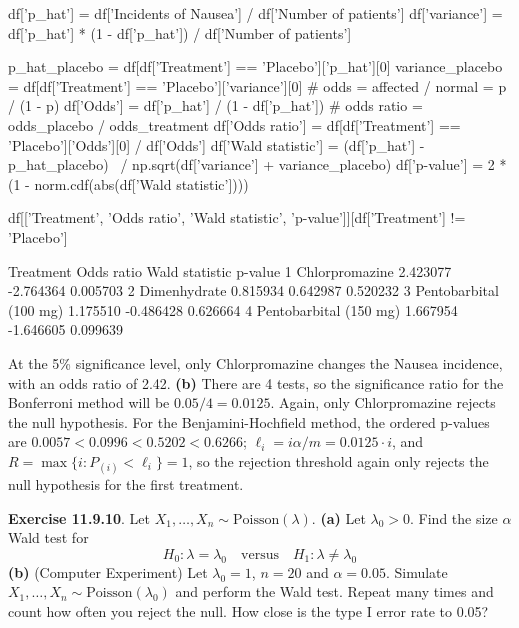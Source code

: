\begin{python}
df['p_hat'] = df['Incidents of Nausea'] / df['Number of patients']
df['variance'] = df['p_hat'] * (1 - df['p_hat']) / df['Number of patients']
\end{python}

\begin{python}
p_hat_placebo = df[df['Treatment'] == 'Placebo']['p_hat'][0]
variance_placebo = df[df['Treatment'] == 'Placebo']['variance'][0]
# odds = affected / normal = p / (1 - p)
df['Odds'] = df['p_hat'] / (1 - df['p_hat'])
# odds ratio = odds_placebo / odds_treatment
df['Odds ratio'] = df[df['Treatment'] == 'Placebo']['Odds'][0] / df['Odds']
df['Wald statistic'] = (df['p_hat'] - p_hat_placebo) \
                        / np.sqrt(df['variance'] + variance_placebo)
df['p-value'] = 2 * (1 - norm.cdf(abs(df['Wald statistic'])))
\end{python}

\begin{python}
df[['Treatment', 'Odds ratio', 'Wald statistic', 'p-value']][df['Treatment'] != 'Placebo']
\end{python}
\begin{console}
                Treatment  Odds ratio  Wald statistic   p-value
1          Chlorpromazine    2.423077       -2.764364  0.005703
2            Dimenhydrate    0.815934        0.642987  0.520232
3  Pentobarbital (100 mg)    1.175510       -0.486428  0.626664
4  Pentobarbital (150 mg)    1.667954       -1.646605  0.099639
\end{console}
        
    At the 5\% significance level, only Chlorpromazine changes the Nausea
incidence, with an odds ratio of 2.42.
\textbf{(b)} There are 4 tests, so the significance ratio for the
Bonferroni method will be \(0.05 / 4 = 0.0125\). Again, only
Chlorpromazine rejects the null hypothesis.
For the Benjamini-Hochfield method, the ordered p-values are
\(0.0057 < 0.0996 < 0.5202 < 0.6266\);
\(\ell_{i} = i \alpha / m = 0.0125 \cdot i\), and
\(R = \max \{ i : P_{(i)} < \ell_{i} \} = 1\), so the rejection threshold
again only rejects the null hypothesis for the first treatment.

\textbf{Exercise 11.9.10}. Let
\(X_{1}, \dots, X_{n} \sim \text{Poisson}(\lambda)\).
\textbf{(a)} Let \(\lambda_{0} > 0\). Find the size \(\alpha\) Wald test
for
\[
H_{0}: \lambda = \lambda_{0} \quad \text{versus} \quad H_{1}: \lambda \neq \lambda_{0}
\]
\textbf{(b)} (Computer Experiment) Let \(\lambda_{0} = 1\), \(n = 20\) and
\(\alpha = 0.05\). Simulate
\(X_{1}, \dots, X_{n} \sim \text{Poisson}(\lambda_{0})\) and perform the Wald
test. Repeat many times and count how often you reject the null. How
close is the type I error rate to 0.05?

